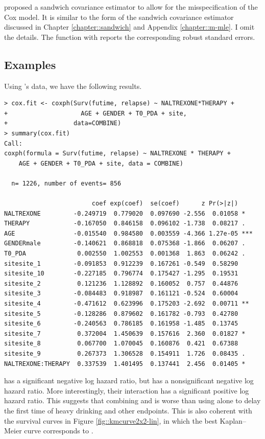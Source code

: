 \citet{lin1989robust} proposed a sandwich covariance estimator to allow for the misspecification of the Cox model.  
It is similar to the form of the sandwich covariance estimator discussed in Chapter \ref{chapter::sandwich} and Appendix \ref{chapter::m-mle}. I omit the details. 
The  function with  reports the corresponding robust standard errors. 



\subsection{Examples}
Using \citet{lin2016simultaneous}'s data, we have the following results. 

\begin{lstlisting}
> cox.fit <- coxph(Surv(futime, relapse) ~ NALTREXONE*THERAPY + 
+                    AGE + GENDER + T0_PDA + site,
+                  data=COMBINE)
> summary(cox.fit)
Call:
coxph(formula = Surv(futime, relapse) ~ NALTREXONE * THERAPY + 
    AGE + GENDER + T0_PDA + site, data = COMBINE)

  n= 1226, number of events= 856 

                        coef exp(coef)  se(coef)      z Pr(>|z|)    
NALTREXONE         -0.249719  0.779020  0.097690 -2.556  0.01058 *  
THERAPY            -0.167050  0.846158  0.096102 -1.738  0.08217 .  
AGE                -0.015540  0.984580  0.003559 -4.366 1.27e-05 ***
GENDERmale         -0.140621  0.868818  0.075368 -1.866  0.06207 .  
T0_PDA              0.002550  1.002553  0.001368  1.863  0.06242 .  
sitesite_1         -0.091853  0.912239  0.167261 -0.549  0.58290    
sitesite_10        -0.227185  0.796774  0.175427 -1.295  0.19531    
sitesite_2          0.121236  1.128892  0.160052  0.757  0.44876    
sitesite_3         -0.084483  0.918987  0.161121 -0.524  0.60004    
sitesite_4         -0.471612  0.623996  0.175203 -2.692  0.00711 ** 
sitesite_5         -0.128286  0.879602  0.161782 -0.793  0.42780    
sitesite_6         -0.240563  0.786185  0.161958 -1.485  0.13745    
sitesite_7          0.372004  1.450639  0.157616  2.360  0.01827 *  
sitesite_8          0.067700  1.070045  0.160876  0.421  0.67388    
sitesite_9          0.267373  1.306528  0.154911  1.726  0.08435 .  
NALTREXONE:THERAPY  0.337539  1.401495  0.137441  2.456  0.01405 * 
\end{lstlisting}

 has a significant negative log hazard ratio, but  has a nonsignificant negative log hazard ratio. More interestingly, their interaction  has a significant positive log hazard ratio. This suggests that combining  and  is worse than using  alone to delay the first time of heavy drinking and other endpoints. This is also coherent with the survival curves in Figure \ref{fig::kmcurve2x2-lin}, in which the best Kaplan--Meier curve corresponds to .





